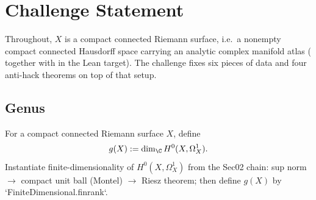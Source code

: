 %

\section{Challenge Statement}
\label{sec:challenge-statement}

Throughout, \(X\) is a compact connected Riemann surface, i.e.\ a
nonempty compact connected Hausdorff space carrying an analytic complex
manifold atlas ( together with
 in the Lean target). The challenge fixes
six pieces of data and four anti-hack theorems on top of that setup.

\subsection{Genus}

\begin{definition}
\label{def:analytic-genus}
For a compact connected Riemann surface \(X\), define
\[
  g(X) := \dim_{\C} H^{0}(X,\Omega^{1}_{X}).
\]
\leanok
\proofplan
Instantiate finite-dimensionality of \(H^0(X,\Omega_X^1)\) from the Sec02 chain:
sup norm \(\to\) compact unit ball (Montel) \(\to\) Riesz theorem; then define
\(g(X)\) by `FiniteDimensional.finrank`.
\end{definition}


